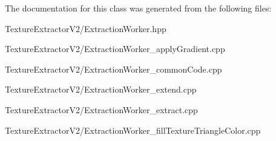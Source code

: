 The documentation for this class was generated from the following files\+:\begin{DoxyCompactItemize}
\item 
Texture\+Extractor\+V2/Extraction\+Worker.\+hpp\item 
Texture\+Extractor\+V2/Extraction\+Worker\+\_\+apply\+Gradient.\+cpp\item 
Texture\+Extractor\+V2/Extraction\+Worker\+\_\+common\+Code.\+cpp\item 
Texture\+Extractor\+V2/Extraction\+Worker\+\_\+extend.\+cpp\item 
Texture\+Extractor\+V2/Extraction\+Worker\+\_\+extract.\+cpp\item 
Texture\+Extractor\+V2/Extraction\+Worker\+\_\+fill\+Texture\+Triangle\+Color.\+cpp\end{DoxyCompactItemize}
